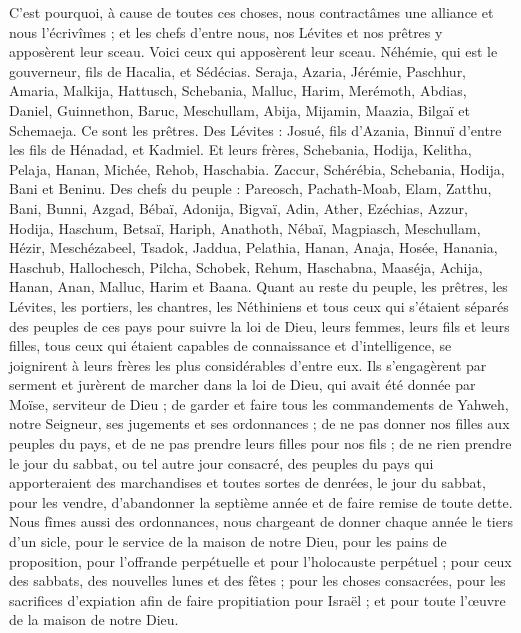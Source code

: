 \begin{multicols}{2}
C'est pourquoi, à cause de toutes ces choses, nous contractâmes une alliance et nous l'écrivîmes ; et les chefs d'entre nous, nos Lévites et nos prêtres y apposèrent leur sceau.
\VerseOne{}Voici ceux qui apposèrent leur sceau. Néhémie, qui est le gouverneur, fils de Hacalia, et Sédécias.
Seraja, Azaria, Jérémie,
Paschhur, Amaria, Malkija,
Hattusch, Schebania, Malluc,
Harim, Merémoth, Abdias,
Daniel, Guinnethon, Baruc,
Meschullam, Abija, Mijamin,
Maazia, Bilgaï et Schemaeja. Ce sont les prêtres.
Des Lévites : Josué, fils d'Azania, Binnuï d'entre les fils de Hénadad, et Kadmiel.
Et leurs frères, Schebania, Hodija, Kelitha, Pelaja, Hanan,
Michée, Rehob, Haschabia.
Zaccur, Schérébia, Schebania,
Hodija, Bani et Beninu.
Des chefs du peuple : Pareosch, Pachath-Moab, Elam, Zatthu, Bani,
Bunni, Azgad, Bébaï,
Adonija, Bigvaï, Adin,
Ather, Ezéchias, Azzur,
Hodija, Haschum, Betsaï,
Hariph, Anathoth, Nébaï,
Magpiasch, Meschullam, Hézir,
Meschézabeel, Tsadok, Jaddua,
Pelathia, Hanan, Anaja,
Hosée, Hanania, Haschub,
Hallochesch, Pilcha, Schobek,
Rehum, Haschabna, Maaséja,
Achija, Hanan, Anan,
Malluc, Harim et Baana.
Quant au reste du peuple, les prêtres, les Lévites, les portiers, les chantres, les Néthiniens et tous ceux qui s'étaient séparés des peuples de ces pays pour suivre la loi de Dieu, leurs femmes, leurs fils et leurs filles, tous ceux qui étaient capables de connaissance et d'intelligence,
se joignirent à leurs frères les plus considérables d'entre eux. Ils s'engagèrent par serment et jurèrent de marcher dans la loi de Dieu, qui avait été donnée par Moïse, serviteur de Dieu ; de garder et faire tous les commandements de Yahweh, notre Seigneur, ses jugements et ses ordonnances ;
de ne pas donner nos filles aux peuples du pays, et de ne pas prendre leurs filles pour nos fils ;
de ne rien prendre le jour du sabbat, ou tel autre jour consacré, des peuples du pays qui apporteraient des marchandises et toutes sortes de denrées, le jour du sabbat, pour les vendre, d'abandonner la septième année et de faire remise de toute dette.
Nous fîmes aussi des ordonnances, nous chargeant de donner chaque année le tiers d'un sicle, pour le service de la maison de notre Dieu,
pour les pains de proposition, pour l'offrande perpétuelle et pour l'holocauste perpétuel ; pour ceux des sabbats, des nouvelles lunes et des fêtes ; pour les choses consacrées, pour les sacrifices d'expiation afin de faire propitiation pour Israël ; et pour toute l'œuvre de la maison de notre Dieu.

\end{multicols}
